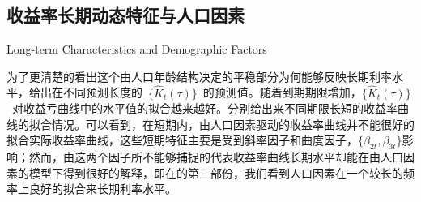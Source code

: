  \subsection{收益率长期动态特征与人口因素}{Long-term Characteristics and Demographic Factors}
 
 为了更清楚的看出这个由人口年龄结构决定的平稳部分为何能够反映长期利率水平，给出在不同预测长度的~$\{\hat{K}_{t}(\tau)\}$~的预测值。随着到期期限增加，$\{\hat{K}_{t}(\tau)\}$~对收益亏曲线中的水平值的拟合越来越好。分别给出来不同期限长短的收益率曲线的拟合情况。可以看到，在短期内，由人口因素驱动的收益率曲线并不能很好的拟合实际收益率曲线，这些短期特征主要是受到斜率因子和曲度因子，$\{\beta_{2t},\beta_{3t}\}$影响；然而，由这两个因子所不能够捕捉的代表收益率曲线长期水平却能在由人口因素的模型下得到很好的解释，即在的第三部份，我们看到人口因素在一个较长的频率上良好的拟合来长期利率水平。
  
